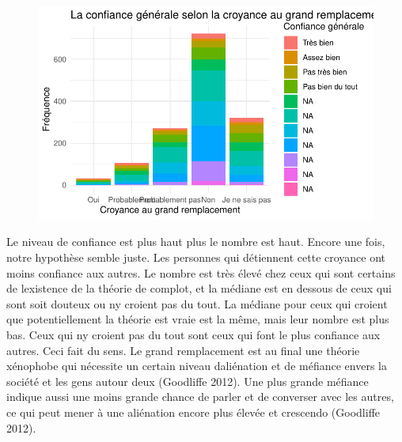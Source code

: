 \documentclass[
  letterpaper,
  DIV=11,
  numbers=noendperiod]{scrartcl}
\begin{document}
\begin{figure}[H]

{\centering \includegraphics{travail_session_Akyildiz_files/figure-pdf/unnamed-chunk-7-1.pdf}

}

\end{figure}

Le niveau de confiance est plus haut plus le nombre est haut. Encore une
fois, notre hypothèse semble juste. Les personnes qui détiennent cette
croyance ont moins confiance aux autres. Le nombre est très élevé chez
ceux qui sont certains de l\textquotesingle existence de la théorie de
complot, et la médiane est en dessous de ceux qui sont soit douteux ou
n\textquotesingle y croient pas du tout. La médiane pour ceux qui
croient que potentiellement la théorie est vraie est la même, mais leur
nombre est plus bas. Ceux qui n\textquotesingle y croient pas du tout
sont ceux qui font le plus confiance aux autres. Ceci fait du sens. Le
grand remplacement est au final une théorie xénophobe qui nécessite un
certain niveau d\textquotesingle aliénation et de méfiance envers la
société et les gens autour d\textquotesingle eux (Goodliffe 2012). Une
plus grande méfiance indique aussi une moins grande chance de parler et
de converser avec les autres, ce qui peut mener à une aliénation encore
plus élevée et crescendo (Goodliffe 2012).
\end{document}
